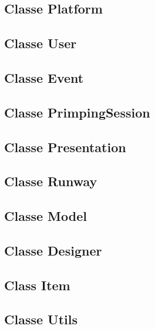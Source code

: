 \documentclass{article}
\begin{document}
\subsection{Classe Platform}


\subsection{Classe User}


\subsection{Classe Event}


\subsection{Classe PrimpingSession}


\subsection{Classe Presentation}


\subsection{Classe Runway}


\subsection{Classe Model}


\subsection{Classe Designer}

\subsection{Class Item}


\subsection{Classe Utils}
\end{document}

